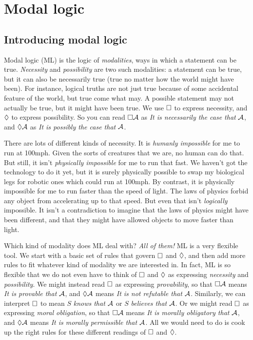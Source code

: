 
\part{Modal logic}
\label{ch.ML}

\chapter{Introducing modal logic}
\label{Intro}

Modal logic (ML) is the logic of \emph{modalities}, ways in which a statement can be true. \emph{Necessity} and \emph{possibility} are two such modalities: a statement can be true, but it can also be necessarily true (true no matter how the world might have been). For instance, logical truths are not just true because of some accidental feature of the world, but true come what may. A possible statement may not actually be true, but it might have been true. We use $\Box$ to express necessity, and $\Diamond$ to express possibility. So you can read $\Box \mathcal{A}$ as \emph{It is necessarily the case that} $\mathcal{A}$, and $\Diamond \mathcal{A}$ as \emph{It is possibly the case that} $\mathcal{A}$.

There are lots of different kinds of necessity. It is \emph{humanly impossible} for me to run at 100mph. Given the sorts of creatures that we are, no human can do that. But still, it isn't \emph{physically impossible} for me to run that fast. We haven't got the technology to do it yet, but it is surely physically possible to swap my biological legs for robotic ones which could run at 100mph. By contrast, it is physically impossible for me to run faster than the speed of light. The laws of physics forbid any object from accelerating up to that speed. But even that isn't \emph{logically} impossible. It isn't a contradiction to imagine that the laws of physics might have been different, and that they might have allowed objects to move faster than light.

Which kind of modality does ML deal with? \emph{All of them!} ML is a very flexible tool. We start with a basic set of rules that govern $\Box$ and $\Diamond$, and then add more rules to fit whatever kind of modality we are interested in. In fact, ML is so flexible that we do not even have to think of $\Box$ and $\Diamond$ as expressing \emph{necessity} and \emph{possibility}. We might instead read $\Box$ as expressing \emph{provability}, so that $\Box\mathcal{A}$ means \emph{It is provable that} $\mathcal{A}$, and $\Diamond\mathcal{A}$ means \emph{It is not refutable that} $\mathcal{A}$. Similarly, we can interpret $\Box$ to mean $S$ \emph{knows that $\mathcal{A}$} or $S$ \emph{believes that $\mathcal{A}$}. Or we might read $\Box$ as expressing \emph{moral obligation}, so that $\Box \mathcal{A}$ means \emph{It is morally obligatory that} $\mathcal{A}$, and $\Diamond \mathcal{A}$ means \emph{It is morally permissible that} $\mathcal{A}$. All we would need to do is cook up the right rules for these different readings of $\Box$ and $\Diamond$.

